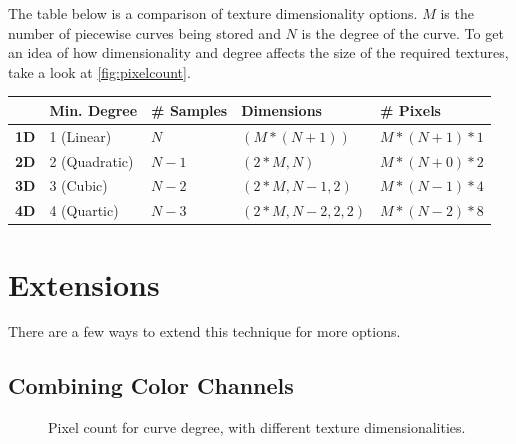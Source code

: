 \documentclass{jcgt}
\begin{document}
The table below is a comparison of texture dimensionality options.  $M$ is the number of piecewise curves being stored and $N$ is the degree of the curve.  To get an idea of how dimensionality and degree affects the size of the required textures, take a look at \autoref{fig:pixelcount}.

\begin{tabular}{|l|l|l|l|l|}
\hline
 & \bf{Min. Degree} & \bf{\# Samples} & \bf{Dimensions} & \bf{\# Pixels} \\ \hline
\bf{1D} & 1 (Linear) & $N$ & $(M*(N+1))$ & $M*(N+1)*1$ \\ \hline
\bf{2D} & 2 (Quadratic) & $N-1$ & $(2*M,N)$ & $M*(N+0)*2$\\ \hline
\bf{3D} & 3 (Cubic) & $N-2$ & $(2*M,N-1,2)$ & $M*(N-1)*4$\\ \hline
\bf{4D} & 4 (Quartic) & $N-3$ & $(2*M,N-2,2,2)$ & $M*(N-2)*8$\\ \hline
\end{tabular}

\section{Extensions}
\label{sec:extensions}

There are a few ways to extend this technique for more options.

\subsection{Combining Color Channels}

\begin{figure}

    \caption{Pixel count for curve degree, with different texture dimensionalities.}
    \label{fig:pixelcount}
  \end{figure}
\end{document}
